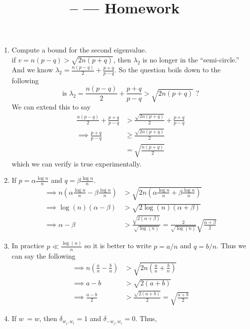 \documentclass[11pt]{article}
\title{\CRS -- \Session --- Homework \Homework} %
\author{\Name}
\date{}
\begin{document}
\maketitle

\begin{enumerate}
	\item Compute a bound for the second eigenvalue. \\
	if $v = n(p-q) > \sqrt{2n(p+q)}$, then $\lambda_2$ is no longer in the ``semi-circle.''
	And we know $\lambda_2 = \frac{n(p-q)}{2} + \frac{p + q}{p - q}$. So the question boils down to the following
	\begin{equation}
		\text{is } \lambda_2 = \frac{n(p-q)}{2} + \frac{p + q}{p - q} > \sqrt{2n(p+q)} \text{ ?}
	\end{equation}
	We can extend this to say
	\begin{align*}
		\frac{n(p-q)}{2} + \frac{p + q}{p - q} &> \frac{\sqrt{2n(p+q)}}{2} + \frac{p + q}{p - q} \\
		\implies \frac{p+q}{p-q} &\ge \frac{\sqrt{2n(p+q)}}{2} \\
		&= \sqrt{\frac{n(p+q)}{2}}
	\end{align*}
	which we can verify is true experimentally.
	\item
	If $p = \alpha \frac{\log n}{n}$ and $q = \beta \frac{\log n}{n}$.
	\begin{align*}
		\implies n \left( \alpha \frac{\log n}{n} - \beta \frac{\log n}{n} \right) &> \sqrt{2n \left( \alpha \frac{\log n}{n} + \beta \frac{\log n}{n} \right) } \\
		\implies \log(n)(\alpha - \beta) &> \sqrt{2 \log (n) \left( \alpha + \beta \right)}\\
		\implies \alpha - \beta &> \frac{\sqrt{2(\alpha + \beta)}}{\sqrt{\log(n)}} = \frac{2}{\sqrt{\log(n)}} \sqrt{\frac{\alpha + \beta}{2}}
	\end{align*}
	\item In practice $p \ll \frac{\log(n)}{n}$ so it is better to write $p = a/n$ and $q=b/n$. Thus we can say the following
	\begin{align*}
		\implies n \left( \frac{a}{n} - \frac{b}{n}\right) &> \sqrt{2n \left( \frac{a}{n} + \frac{b}{n} \right)} \\
		\implies a - b &> \sqrt{2(a + b)} \\
		\implies \frac{a - b}{2} &> \frac{\sqrt{2(a + b)}}{2} = \sqrt{\frac{a + b}{2}}
	\end{align*}
	\item If $w^{~} = w$, then $\delta_{w_i^{~}, w_i} = 1$ and $\delta_{-w_i^{~}, w_i} = 0$. Thus,

\end{enumerate}
\end{document}
